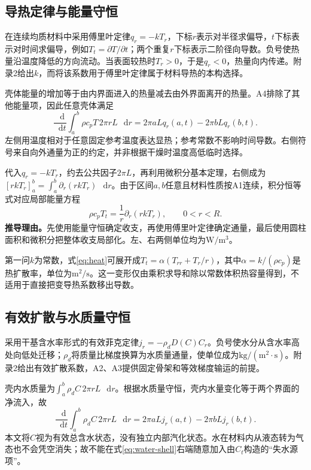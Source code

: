 \documentclass[UTF8,a4paper,zihao=-4,fontset=none]{ctexart}
\numberwithin{equation}{section}
\newcommand{\dd}{\mathop{}\!\mathrm d}
\newcommand{\pd}{\partial}
\newcommand{\reason}[1]{\textbf{推导理由。}#1\par}
\begin{document}
\subsection{导热定律与能量守恒}
在连续均质材料中采用傅里叶定律$q_r=-kT_r$，下标$r$表示对半径求偏导，$t$下标表示对时间求偏导，例如$T_t=\partial T/\partial t$；两个重复$r$下标表示二阶径向导数。负号使热量沿温度降低的方向流动。当表面较热时$T_r>0$，于是$q_r<0$，热量向内传递。附录2给出$k$，而将该系数用于傅里叶定律属于材料导热的本构选择。

壳体能量的增加等于由内界面进入的热量减去由外界面离开的热量。A4排除了其他能量项，因此任意壳体满足
\begin{equation}
\frac{\dd}{\dd t}\int_a^b \rho c_pT\,2\pi rL\,\dd r
=2\pi aLq_r(a,t)-2\pi bLq_r(b,t).
\label{eq:heat-shell}
\end{equation}
左侧用温度相对于任意固定参考温度表达显热；参考常数不影响时间导数。右侧符号来自向外通量为正的约定，并非根据干燥时温度高低临时选择。

代入$q_r=-kT_r$，约去公共因子$2\pi L$，再利用微积分基本定理，右侧成为$[rkT_r]_a^b=\int_a^b\pd_r(rkT_r)\,\dd r$。由于区间$a,b$任意且材料性质按A1连续，积分恒等式对应局部能量方程
\begin{equation}
\rho c_pT_t=\frac1r\pd_r(rkT_r),\qquad 0<r<R.
\label{eq:heat}
\end{equation}
\reason{先使用能量守恒确定收支，再使用傅里叶定律确定通量，最后使用圆柱面积和微积分把整体收支局部化。左、右两侧单位均为$\mathrm{W/m^3}$。}

第一问$k$为常数，式\eqref{eq:heat}可展开成$T_t=\alpha(T_{rr}+T_r/r)$，其中$\alpha=k/(\rho c_p)$是热扩散率，单位为$\mathrm{m^2/s}$。这一变形仅由乘积求导和除以常数体积热容量得到，不适用于直接把变导热系数移出导数。

\subsection{有效扩散与水质量守恒}
采用干基含水率形式的有效菲克定律$j_r=-\rho_dD(C)C_r$。负号使水分从含水率高处向低处迁移；$\rho_d$将质量比梯度换算为水质量通量，使单位成为$\mathrm{kg/(m^2\cdot s)}$。附录2给出有效扩散系数，A2、A3提供固定骨架和等效梯度输运的前提。

壳内水质量为$\int_a^b\rho_dC\,2\pi rL\,\dd r$。根据水质量守恒，壳内水量变化等于两个界面的净流入，故
\begin{equation}
\frac{\dd}{\dd t}\int_a^b\rho_dC\,2\pi rL\,\dd r
=2\pi aLj_r(a,t)-2\pi bLj_r(b,t).
\label{eq:water-shell}
\end{equation}
本文将$C$视为有效总含水状态，没有独立内部汽化状态。水在材料内从液态转为气态也不会凭空消失；故不能在式\eqref{eq:water-shell}右端随意加入由$C_t$构造的“失水源项”。
\end{document}
